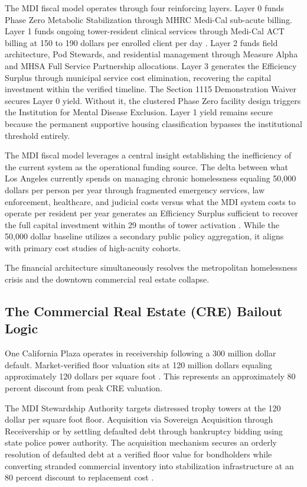 \documentclass[12pt, letterpaper]{article}
\begin{document}
The MDI fiscal model operates through four reinforcing layers. Layer 0 funds Phase Zero Metabolic Stabilization through MHRC Medi-Cal sub-acute billing. Layer 1 funds ongoing tower-resident clinical services through Medi-Cal ACT billing at 150 to 190 dollars per enrolled client per day \citep{medi_cal_act_2024}. Layer 2 funds field architecture, Pod Stewards, and residential management through Measure Alpha and MHSA Full Service Partnership allocations. Layer 3 generates the Efficiency Surplus through municipal service cost elimination, recovering the capital investment within the verified timeline. The Section 1115 Demonstration Waiver secures Layer 0 yield. Without it, the clustered Phase Zero facility design triggers the Institution for Mental Disease Exclusion. Layer 1 yield remains secure because the permanent supportive housing classification bypasses the institutional threshold entirely.

The MDI fiscal model leverages a central insight establishing the inefficiency of the current system as the operational funding source. The delta between what Los Angeles currently spends on managing chronic homelessness equaling 50,000 dollars per person per year through fragmented emergency services, law enforcement, healthcare, and judicial costs versus what the MDI system costs to operate per resident per year generates an Efficiency Surplus sufficient to recover the full capital investment within 29 months of tower activation \citep{ucsf_bhhi_2023, calmatters_2026}. While the 50,000 dollar baseline utilizes a secondary public policy aggregation, it aligns with primary cost studies of high-acuity cohorts.

The financial architecture simultaneously resolves the metropolitan homelessness crisis and the downtown commercial real estate collapse.

\subsection{The Commercial Real Estate (CRE) Bailout Logic}

One California Plaza operates in receivership following a 300 million dollar default. Market-verified floor valuation sits at 120 million dollars equaling approximately 120 dollars per square foot \citep{globest_2025}. This represents an approximately 80 percent discount from peak CRE valuation.

The MDI Stewardship Authority targets distressed trophy towers at the 120 dollar per square foot floor. Acquisition via Sovereign Acquisition through Receivership or by settling defaulted debt through bankruptcy bidding using state police power authority. The acquisition mechanism secures an orderly resolution of defaulted debt at a verified floor value for bondholders while converting stranded commercial inventory into stabilization infrastructure at an 80 percent discount to replacement cost \citep{estrada_2026, allwork_2026}.
\end{document}
